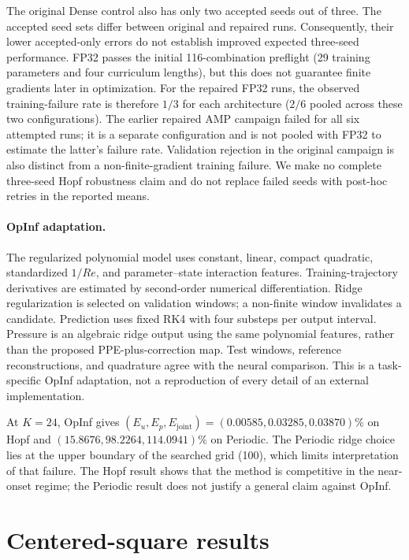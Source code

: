 \documentclass{article}
\providecommand{\DIFaddtex}[1]{{\protect\color{blue} \sf #1}} %
\providecommand{\DIFaddbegin}{} %
\providecommand{\DIFaddend}{} %
\providecommand{\DIFadd}[1]{\texorpdfstring{\DIFaddtex{#1}}{#1}} %
\begin{document}
The original Dense control also has only two accepted seeds out of three.
The accepted seed sets differ between original and repaired runs.
Consequently, their lower accepted-only errors do not establish improved
expected three-seed performance. FP32 passes the initial 116-combination
preflight (29 training parameters and four curriculum lengths), but this
does not guarantee finite gradients later in optimization.
\DIFaddbegin \DIFadd{For the repaired FP32 runs, the observed training-failure rate is therefore
$1/3$ for each architecture ($2/6$ pooled across these two configurations).
The earlier repaired AMP campaign failed for all six attempted runs;
it is a separate configuration and is not pooled with FP32 to estimate
the latter's failure rate. Validation rejection in the original campaign
is also distinct from a non-finite-gradient training failure. We make no
complete three-seed Hopf robustness claim and do not replace failed seeds
with post-hoc retries in the reported means.
}\DIFaddend 

\paragraph{OpInf adaptation.}
The regularized polynomial model uses constant, linear, compact quadratic,
standardized $1/Re$, and parameter--state interaction features.
Training-trajectory derivatives are estimated by second-order numerical
differentiation. Ridge regularization is selected on validation windows;
a non-finite window invalidates a candidate. Prediction uses fixed RK4
with four substeps per output interval. Pressure is an algebraic ridge
output using the same polynomial features, rather than the proposed
PPE-plus-correction map. Test windows, reference reconstructions, and
quadrature agree with the neural comparison. This is a task-specific
OpInf adaptation, not a reproduction of every detail of an external
implementation.

At $K=24$, OpInf gives $(E_u,E_p,E_{\mathrm{joint}})=
(0.00585,0.03285,0.03870)\%$ on Hopf and
$(15.8676,98.2264,114.0941)\%$ on Periodic.
The Periodic ridge choice lies at the upper boundary of the searched
grid (100), which limits interpretation of that failure. The Hopf result
shows that the method is competitive in the near-onset regime; the
Periodic result does not justify a general claim against OpInf.

\FloatBarrier

\section{Centered-square results}
\label{app:square}
\end{document}
